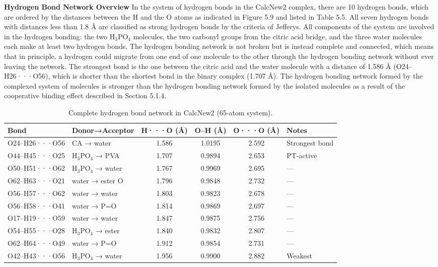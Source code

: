 \documentclass[12pt,a4paper]{report}
\begin{document}
\textbf{Hydrogen Bond Network Overview}
In the system of hydrogen bonds in the CalcNew2 complex, there are 10 hydrogen bonds, which are ordered by the distances between the H and the O atoms as indicated in Figure 5.9 and listed in Table 5.5. All seven hydrogen bonds with distances less than 1.8 Å are classified as strong hydrogen bonds by the criteria of Jefferys.\cite{97} All components of the system are involved in the hydrogen bonding: the two H\(_3\)PO\(_4\) molecules, the two carbonyl groups from the citric acid bridge, and the three water molecules each make at least two hydrogen bonds. The hydrogen bonding network is not broken but is instead complete and connected, which means that in principle, a hydrogen could migrate from one end of one molecule to the other through the hydrogen bonding network without ever leaving the network.\cite{97,98} The strongest bond is the one between the citric acid and the water molecule with a distance of 1.586 Å (O24–H26···O56), which is shorter than the shortest bond in the binary complex (1.707 Å). The hydrogen bonding network formed by the complexed system of molecules is stronger than the hydrogen bonding network formed by the isolated molecules as a result of the cooperative binding effect described in Section 5.1.4.\cite{100}

\begin{table}[h!]
\centering
\caption{Complete hydrogen bond network in CalcNew2 (65-atom system).}
\label{tab:calcnew2-hbonds}
\begin{tabular}{l l c c c l}
\toprule
Bond & Donor→Acceptor & H···O (Å) & O–H (Å) & O···O (Å) & Notes \\
\midrule
O24–H26···O56 & CA → water & 1.586 & 1.0195 & 2.592 & Strongest bond \\
O44–H45···O25 & H\(_3\)PO\(_4\) → PVA & 1.707 & 0.9894 & 2.653 & PT-active \\
O50–H51···O62 & H\(_3\)PO\(_4\) → water & 1.767 & 0.9969 & 2.695 & --- \\
O62–H63···O21 & water → ester O & 1.796 & 0.9848 & 2.732 & --- \\
O56–H57···O62 & water → water & 1.803 & 0.9823 & 2.678 & --- \\
O56–H58···O41 & water → P=O & 1.814 & 0.9869 & 2.697 & --- \\
O17–H19···O59 & water → water & 1.847 & 0.9875 & 2.756 & --- \\
O54–H55···O28 & H\(_3\)PO\(_4\) → ester & 1.840 & 0.9832 & 2.807 & --- \\
O62–H64···O49 & water → P=O & 1.912 & 0.9854 & 2.731 & --- \\
O42–H43···O56 & H\(_3\)PO\(_4\) → water & 1.956 & 0.9900 & 2.882 & Weakest \\
\bottomrule
\end{tabular}
\end{table}
\end{document}
